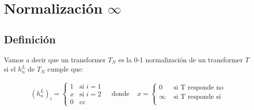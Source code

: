\section*{Normalización $\infty$}

\subsection*{Definición}

Vamos a decir que un transformer $T_N$ es la 0-1 normalización de un transformer $T$ si el $h_n^L$ de $T_N$ cumple que:

\begin{align*}
    & (h_n^L)_i =
    \begin{cases}
    1 & \text{si } i = 1 \\
    x & \text{si } i = 2 \\
    0 & \text{cc }
    \end{cases} 
    & \text{ donde }
    & x = 
    \begin{cases}
    0 & \text{ si T responde no }  \\
    \infty & \text{ si T responde sí } \\
    \end{cases} 
\end{align*}
